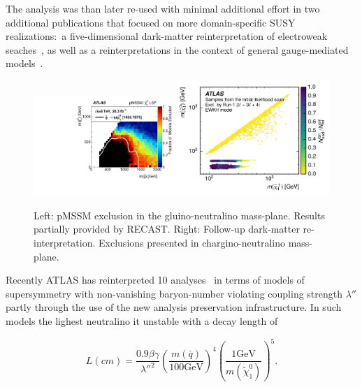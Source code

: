 The analysis was than later re-used with minimal additional effort in two additional publications that focused on more domain-specific SUSY realizations:~a five-dimensional dark-matter reinterpretation of electroweak seaches~\cite{Aaboud:2016wna}, as well as a reinterpretations in the context of general gauge-mediated models~\cite{ATLAS-CONF-2016-033}.

\begin{figure}[t]
\begin{center}
\includegraphics[width=0.48\textwidth,angle=0]{ch5-figures/pMSSM.pdf}\includegraphics[width=0.52\textwidth,angle=0]{ch5-figures/DM.pdf}

\end{center}
\caption{
Left: pMSSM exclusion in the gluino-neutralino mass-plane. Results partially provided by RECAST.
Right: Follow-up dark-matter re-interpretation. Exclusions presented in chargino-neutralino mass-plane.
}
\label{fig:recast-cc}
\end{figure}



Recently ATLAS has reinterpreted 10 analyses~\cite{ATLAS-CONF-2018-003} in terms of models of supersymmetry with non-vanishing baryon-number violating coupling strength $\lambda''$ partly through the use of the new analysis preservation infrastructure. In such models the lighest neutralino it unstable with a decay length of

\begin{equation}
  L(cm) = \frac{0.9\beta\gamma}{{\lambda''}^2} \left(\frac{m(\bar{q})}{100\mathrm{GeV}}\right)^4\left(\frac{1\mathrm{GeV}}{m(\tilde{\chi}_1^0)}\right)^5.
\end{equation}

